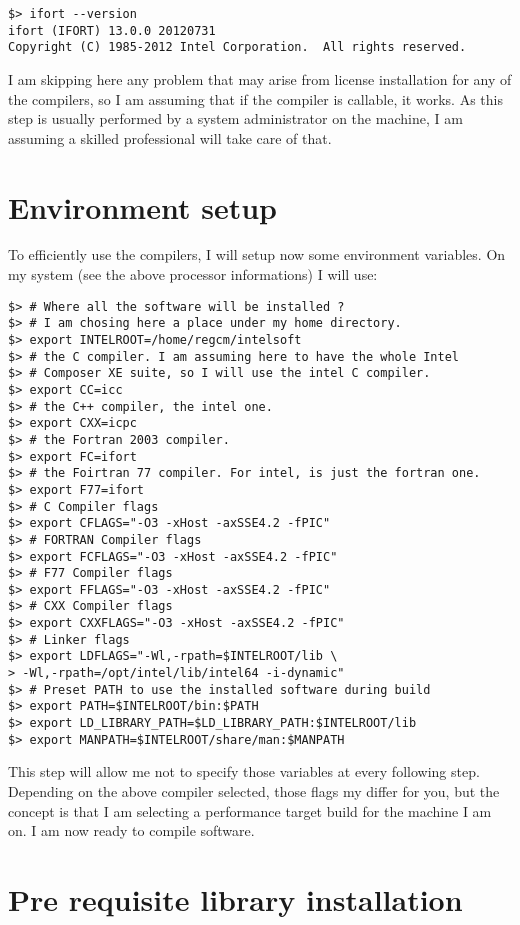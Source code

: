 \begin{Verbatim}
$> ifort --version
ifort (IFORT) 13.0.0 20120731
Copyright (C) 1985-2012 Intel Corporation.  All rights reserved.
\end{Verbatim}

I am skipping here any problem that may arise from license installation for any
of the compilers, so I am assuming that if the compiler is callable, it works.
As this step is usually performed by a system administrator on the machine,
I am assuming a skilled professional will take care of that.

\section{Environment setup}

To efficiently use the compilers, I will setup now some environment variables.
On my system (see the above processor informations) I will use:

\begin{Verbatim}
$> # Where all the software will be installed ?
$> # I am chosing here a place under my home directory.
$> export INTELROOT=/home/regcm/intelsoft
$> # the C compiler. I am assuming here to have the whole Intel
$> # Composer XE suite, so I will use the intel C compiler.
$> export CC=icc
$> # the C++ compiler, the intel one.
$> export CXX=icpc
$> # the Fortran 2003 compiler.
$> export FC=ifort
$> # the Foirtran 77 compiler. For intel, is just the fortran one.
$> export F77=ifort
$> # C Compiler flags
$> export CFLAGS="-O3 -xHost -axSSE4.2 -fPIC"
$> # FORTRAN Compiler flags
$> export FCFLAGS="-O3 -xHost -axSSE4.2 -fPIC"
$> # F77 Compiler flags
$> export FFLAGS="-O3 -xHost -axSSE4.2 -fPIC"
$> # CXX Compiler flags
$> export CXXFLAGS="-O3 -xHost -axSSE4.2 -fPIC"
$> # Linker flags
$> export LDFLAGS="-Wl,-rpath=$INTELROOT/lib \
> -Wl,-rpath=/opt/intel/lib/intel64 -i-dynamic"
$> # Preset PATH to use the installed software during build
$> export PATH=$INTELROOT/bin:$PATH
$> export LD_LIBRARY_PATH=$LD_LIBRARY_PATH:$INTELROOT/lib
$> export MANPATH=$INTELROOT/share/man:$MANPATH
\end{Verbatim}

This step will allow me not to specify those variables at every following step.
Depending on the above compiler selected, those flags my differ for you, but the
concept is that I am selecting a performance target build for the machine I am
on. I am now ready to compile software.

\section{Pre requisite library installation}

